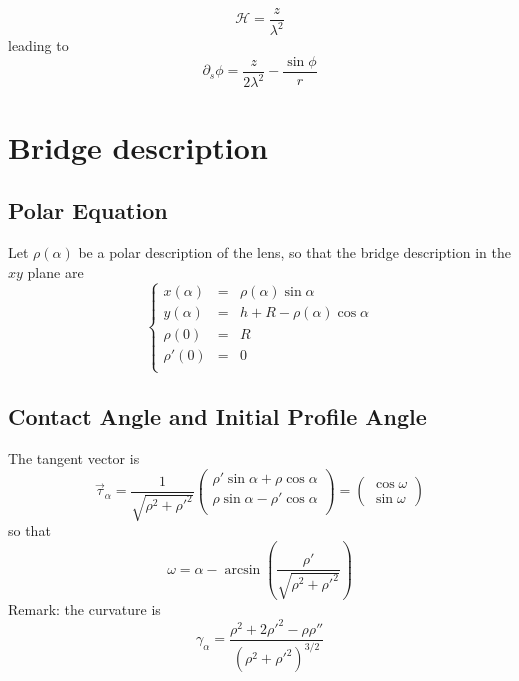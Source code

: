 \documentclass[aps,onecolumn]{revtex4}
\begin{document}
\begin{equation}
	\mathcal{H} = \dfrac{z}{\lambda^2}
\end{equation}
leading to
\begin{equation}
	\partial_s \phi = \dfrac{z}{2\lambda^2} - \dfrac{\sin\phi}{r}
\end{equation}

\section{Bridge description}
\subsection{Polar Equation}
Let $\rho(\alpha)$ be a polar description of the lens, so that the bridge description in the $xy$ plane are
\begin{equation}
	\left\lbrace
	\begin{array}{rcl}
	x(\alpha) & = & \rho(\alpha)\sin\alpha\\
	y(\alpha) & = & h + R - \rho(\alpha)\cos\alpha\\
	\rho(0)   & = & R\\
	\rho'(0)  & = & 0\\
	\end{array}
	\right.
\end{equation}

\subsection{Contact Angle and Initial Profile Angle}
The   tangent vector is
\begin{equation}
	\vec{\tau}_\alpha = 
	\dfrac{1}{\sqrt{\rho^2+\rho'^2}}
	\begin{pmatrix}
		\rho'\sin\alpha+\rho\cos\alpha\\
		\rho\sin\alpha - \rho'\cos\alpha\\
	\end{pmatrix}
 = 
 	\begin{pmatrix}
	\cos\omega\\
	\sin\omega
	\end{pmatrix}
\end{equation}
so that
\begin{equation}
	\label{eq:omega}
	\omega = \alpha - \arcsin\left(\dfrac{\rho'}{\sqrt{\rho^2+\rho'^2}}\right)
\end{equation}
Remark: the curvature is
\begin{equation}
	\gamma_\alpha = \dfrac{\rho^2 + 2\rho'^2 - \rho\rho''}{\left(\rho^2+\rho'^2\right)^{3/2}}
\end{equation}
\end{document}
